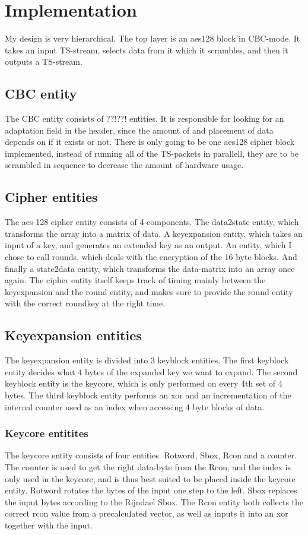 \section{Implementation}
My design is very hierarchical. The top layer is an aes128 block in CBC-mode. 
It takes an input TS-stream, selects data from it which it scrambles, and then 
it outputs a TS-stream. 

\subsection{CBC entity}
The CBC entity consists of ??!??! entities. It is responsible for looking for an 
adaptation field in the header, since the amount of and placement of data depends
on if it exists or not. There is only going to be one aes128 cipher block 
implemented, instead of running all of the TS-packets in parallell, they are to 
be scrambled in sequence to decrease the amount of hardware usage.

\subsection{Cipher entities}
The aes-128 cipher entity consists of 4 components. The data2state entity, which 
transforms the array into a matrix of data. A keyexpansion entity, which takes 
an input of a key, and generates an extended key as an output. An entity, which I
chose to call rounds, which deals with the encryption of the 16 byte blocks. And 
finally a state2data entity, which transforms the data-matrix into an array once 
again. The cipher entity itself keeps track of timing mainly between the 
keyexpansion and the round entity, and makes sure to provide the round entity 
with the correct roundkey at the right time.

\subsection{Keyexpansion entities}
The keyexpansion entity is divided into 3 keyblock entities. The first keyblock 
entity decides what 4 bytes of the expanded key we want to expand. The second 
keyblock entity is the keycore, which is only performed on every 4th set of 
4 bytes. The third keyblock entity performs an xor and an incrementation of the 
internal counter used as an index when accessing 4 byte blocks of data.

\subsubsection{Keycore entitites}
The keycore entity consists of four entities. Rotword, Sbox, Rcon and a counter. 
The counter is used to get the right data-byte from the Rcon, and the index is 
only used in the keycore, and is thus best suited to be placed inside the 
keycore entity. Rotword rotates the bytes of the input one step to the left. 
Sbox replaces the input bytes according to the Rijndael Sbox. The Rcon entity 
both collects the correct rcon value from a precalculated vector, as well as 
inputs it into an xor together with the input.

